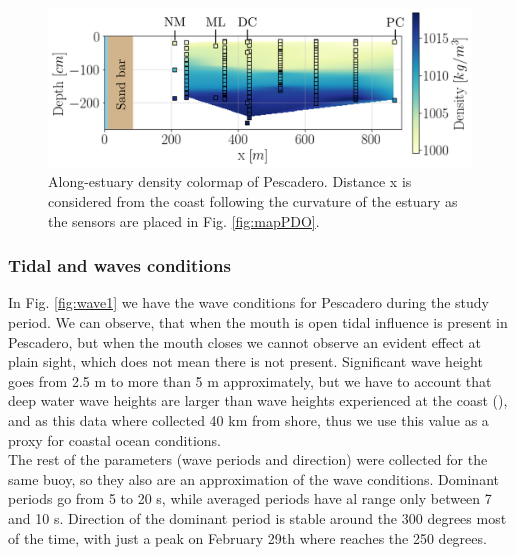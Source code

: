 \documentclass[11pt,letterpaper]{article}
\begin{document}
\begin{figure}[h!]
    \centering
    \includegraphics[scale=0.6]{Imagenes/vista_long2.png}
    \caption{Along-estuary density colormap of Pescadero. Distance x is considered from the coast following the curvature of the estuary as the sensors are placed in Fig. \ref{fig:mapPDO}. }
    \label{fig:perfiles1}
\end{figure}

\subsubsection{Tidal and waves conditions}

In Fig. \ref{fig:wave1} we have the wave conditions for Pescadero during the study period. We can observe, that when the mouth is open tidal influence is present in Pescadero, but when the mouth closes we cannot observe an evident effect at plain sight, which does not mean there is not present. Significant wave height goes from 2.5 m to more than 5 m approximately, but we have to account that deep water wave heights are larger than wave heights experienced at the coast (\cite{Williams2014}), and as this data where collected 40 km from shore, thus we use this value as a proxy for coastal ocean conditions.  \\

The rest of the parameters (wave periods and direction) were collected for the same buoy, so they also are an approximation of the wave conditions. Dominant periods go from 5 to 20 s, while averaged periods have al range only between 7 and 10 s. Direction of the dominant period is stable around the 300 degrees most of the time, with just a peak on February 29th where reaches the 250 degrees.\\
\end{document}

